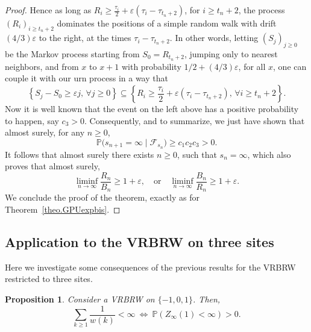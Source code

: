 \documentclass[11pt]{article}
\newtheorem {prop} {Proposition} [section]
\newcommand{\1}{{\text{\Large $\mathfrak 1$}}}
\begin{document}
\begin{proof}
Hence as long as $R_i \ge \frac{\tau_i}{2} + \varepsilon(\tau_i - \tau_{t_n+2})$, for $ i\ge t_n +2$, the process $(R_i)_{i\ge t_n +2}$ dominates the positions of a simple random walk with drift $(4/3)\varepsilon$ to the right, at the times $\tau_i - \tau_{t_n+2}$. In other words, letting $(S_j)_{j\ge 0}$ be the Markov process starting from $S_0 = R_{t_n +2}$, jumping only to nearest neighbors, and from $x$ to $x+1$ with probability $1/2 + (4/3)\varepsilon$, for all $x$, one can couple it with our urn process in a way that  
$$ \left\{ S_j - S_0\ge \varepsilon j,\,  \forall j\ge 0\right\} \subseteq \left\{ R_i \ge \frac{\tau_i}{2} + \varepsilon(\tau_i - \tau_{t_n+2}), \, \forall i\ge t_n+2 \right\}. $$  
Now it is well known that the event on the left above has a positive probability to happen, say $c_3>0$. Consequently, and to summarize, we just have shown that almost surely, for any $n\ge 0$,  
$$\mathbb P\big( s_{n+1} = \infty \mid \mathcal F_{s_n}\big) \ge c_1c_2c_3>0. $$ 
It follows that almost surely there exists $n\ge 0$, such that $s_n = \infty$, which also proves that almost surely, 
$$\liminf_{n\to \infty} \frac{R_n}{B_n} \ge 1+ \varepsilon, \quad \text{or} \quad \liminf_{n\to \infty} \frac{B_n}{R_n} \ge 1+ \varepsilon. $$ 
We conclude the proof of the theorem, exactly as for Theorem~\ref{theo.GPUexpbis}.
\end{proof}


\subsection{Application to the VRBRW on three sites}\label{sec:VRBRW3sites} 
Here we investigate some consequences of the previous results for the VRBRW restricted to three sites. 
\begin{prop} \label{prop:VRBRW3sites}
Consider a VRBRW on $\{-1,0,1\}$. Then,  
$$\sum_{k\ge 1} \frac 1{w(k)}<\infty\ \Longleftrightarrow\  \mathbb P(Z_\infty(1)<\infty)>0.$$   
\end{prop}
\end{document}
